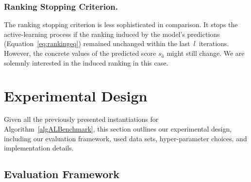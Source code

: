 \documentclass[runningheads]{llncs}
\begin{document}
\subsubsection{Ranking Stopping Criterion.}

The ranking stopping criterion is less sophisticated in comparison.
It stops the active-learning process if the ranking induced by the model's predictions (Equation~\ref{eq:rankingeq}) remained unchanged within the last~$l$~iterations.
However, the concrete values of the predicted score $s_{\hat a}$ might still change.
We are solemnly interested in the induced ranking in this case.


\section{Experimental Design}
\label{sec:exdesign}

Given all the previously presented instantiations for Algorithm~\ref{algALBenchmark}, this section outlines our experimental design, including our evaluation framework, used data sets, hyper-parameter choices, and implementation details.

\subsection{Evaluation Framework}
\label{sec:exdesign:eval}
\end{document}
